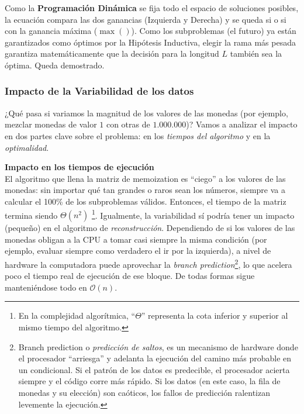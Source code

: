 Como la \textbf{Programación Dinámica} se fija todo el espacio de soluciones posibles, la ecuación compara las dos ganancias (Izquierda y Derecha) y se queda si o si con la ganancia máxima ($\max()$). Como los subproblemas (el futuro) ya están garantizados como óptimos por la Hipótesis Inductiva, elegir la rama más pesada garantiza matemáticamente que la decisión para la longitud $L$ también sea la óptima. Queda demostrado.

\subsubsection{Impacto de la Variabilidad de los datos}

¿Qué pasa si variamos la magnitud de los valores de las monedas (por ejemplo, mezclar monedas de valor $1$ con otras de $1.000.000$)? 
Vamos a analizar el impacto en dos partes clave sobre el problema: en los \textit{tiempos del algoritmo} y en la \textit{optimalidad}.

\textbf{Impacto en los tiempos de ejecución}
\\
El algoritmo que llena la matriz de memoization es ``ciego'' a los valores de las monedas: sin importar qué tan grandes o raros sean los números, siempre va a calcular el 100\% de los subproblemas válidos. Entonces, el tiempo de la matriz termina siendo $\Theta(n^2)$ \footnote{En la complejidad algorítmica, ``$\Theta$'' representa la cota inferior y superior al mismo tiempo del algoritmo.}.
Igualmente, la variabilidad sí podría tener un impacto (pequeño) en el algoritmo de \textit{reconstrucción}. Dependiendo de si los valores de las monedas obligan a la CPU a tomar casi siempre la misma condición (por ejemplo, evaluar siempre como verdadero el ir por la izquierda), a nivel de hardware la computadora puede aprovechar la \textit{branch prediction}\footnote{Branch prediction o \textit{predicción de saltos}, es un mecanismo de hardware donde el procesador ``arriesga'' y adelanta la ejecución del camino más probable en un condicional. Si el patrón de los datos es predecible, el procesador acierta siempre y el código corre más rápido. Si los datos (en este caso, la fila de monedas y su elección) son caóticos, los fallos de predicción ralentizan levemente la ejecución.}, lo que acelera poco el tiempo real de ejecución de ese bloque. De todas formas sigue manteniéndose todo en $\mathcal{O}(n)$.


